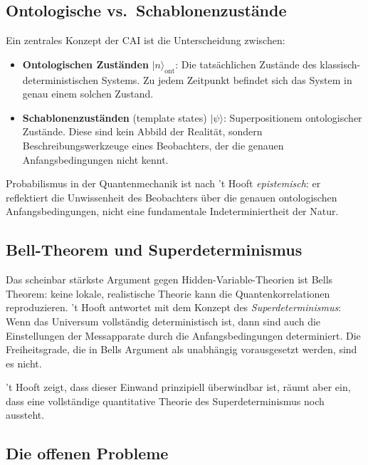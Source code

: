 \subsection{Ontologische vs.\ Schablonenzustände}

Ein zentrales Konzept der CAI ist die Unterscheidung zwischen:
\begin{itemize}
    \item \textbf{Ontologischen Zuständen} $|n\rangle_{\text{ont}}$: Die tatsächlichen
    Zustände des klassisch-deterministischen Systems. Zu jedem Zeitpunkt befindet
    sich das System in genau einem solchen Zustand.
    \item \textbf{Schablonenzuständen} (template states) $|\psi\rangle$: Superpositionem
    ontologischer Zustände. Diese sind kein Abbild der Realität, sondern
    Beschreibungswerkzeuge eines Beobachters, der die genauen Anfangsbedingungen
    nicht kennt.
\end{itemize}

Probabilismus in der Quantenmechanik ist nach 't Hooft \emph{epistemisch}: er
reflektiert die Unwissenheit des Beobachters über die genauen ontologischen
Anfangsbedingungen, nicht eine fundamentale Indeterminiertheit der Natur.

\subsection{Bell-Theorem und Superdeterminismus}

Das scheinbar stärkste Argument gegen Hidden-Variable-Theorien ist Bells Theorem:
keine lokale, realistische Theorie kann die Quantenkorrelationen reproduzieren.
't Hooft antwortet mit dem Konzept des \emph{Superdeterminismus}: Wenn das Universum
vollständig deterministisch ist, dann sind auch die Einstellungen der Messapparate
durch die Anfangsbedingungen determiniert. Die Freiheitsgrade, die in Bells Argument
als unabhängig vorausgesetzt werden, sind es nicht.

't Hooft zeigt, dass dieser Einwand prinzipiell überwindbar ist, räumt aber ein,
dass eine vollständige quantitative Theorie des Superdeterminismus noch aussteht.

\subsection{Die offenen Probleme}

